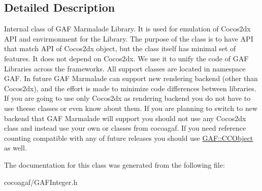 \subsection{Detailed Description}
Internal class of G\-A\-F Marmalade Library. It is used for emulation of Cocos2dx A\-P\-I and envirmonment for the Library. The purpose of the class is to have A\-P\-I that match A\-P\-I of Cocos2dx object, but the class itself has minimal set of features. It does not depend on Cocos2dx. We use it to unify the code of G\-A\-F Libraries across the frameworks. All support classes are located in namespace G\-A\-F. In future G\-A\-F Marmalade can support new rendering backend (other than Cocos2dx), and the effort is made to minimize code differences between libraries. If you are going to use only Cocos2dx as rendering backend you do not have to use theese classes or even know about them. If you are planning to switch to new backend that G\-A\-F Marmalade will support you should not use any Cocos2dx class and instead use your own or classes from cocoagaf. If you need reference counting compatible with any of future releases you should use \hyperlink{class_g_a_f_1_1_c_c_object}{G\-A\-F\-::\-C\-C\-Object} as well. 

The documentation for this class was generated from the following file\-:\begin{DoxyCompactItemize}
\item 
cocoagaf/G\-A\-F\-Integer.\-h\end{DoxyCompactItemize}

